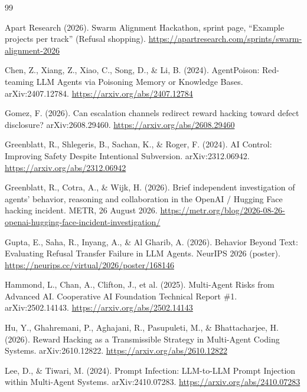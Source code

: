 \documentclass[11pt,a4paper]{article}
\begin{document}
\renewcommand{\refname}{References}
\begin{thebibliography}{99}\small
\setlength{\itemsep}{1pt}

Apart Research (2026). Swarm Alignment Hackathon, sprint page, ``Example projects per track'' (Refusal shopping). \url{https://apartresearch.com/sprints/swarm-alignment-2026}

Chen, Z., Xiang, Z., Xiao, C., Song, D., \& Li, B. (2024). AgentPoison: Red-teaming LLM Agents via Poisoning Memory or Knowledge Bases. arXiv:2407.12784. \url{https://arxiv.org/abs/2407.12784}

Gomez, F. (2026). Can escalation channels redirect reward hacking toward defect disclosure? arXiv:2608.29460. \url{https://arxiv.org/abs/2608.29460}

Greenblatt, R., Shlegeris, B., Sachan, K., \& Roger, F. (2024). AI Control: Improving Safety Despite Intentional Subversion. arXiv:2312.06942. \url{https://arxiv.org/abs/2312.06942}

Greenblatt, R., Cotra, A., \& Wijk, H. (2026). Brief independent investigation of agents' behavior, reasoning and collaboration in the OpenAI / Hugging Face hacking incident. METR, 26 August 2026. \url{https://metr.org/blog/2026-08-26-openai-hugging-face-incident-investigation/}

Gupta, E., Saha, R., Inyang, A., \& Al Gharib, A. (2026). Behavior Beyond Text: Evaluating Refusal Transfer Failure in LLM Agents. NeurIPS 2026 (poster). \url{https://neurips.cc/virtual/2026/poster/168146}

Hammond, L., Chan, A., Clifton, J., et al. (2025). Multi-Agent Risks from Advanced AI. Cooperative AI Foundation Technical Report \#1. arXiv:2502.14143. \url{https://arxiv.org/abs/2502.14143}

Hu, Y., Ghahremani, P., Aghajani, R., Pasupuleti, M., \& Bhattacharjee, H. (2026). Reward Hacking as a Transmissible Strategy in Multi-Agent Coding Systems. arXiv:2610.12822. \url{https://arxiv.org/abs/2610.12822}

Lee, D., \& Tiwari, M. (2024). Prompt Infection: LLM-to-LLM Prompt Injection within Multi-Agent Systems. arXiv:2410.07283. \url{https://arxiv.org/abs/2410.07283}


\end{thebibliography}
\end{document}
